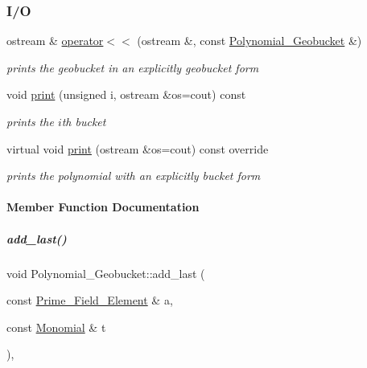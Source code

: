 \subsubsection*{I/O}
\begin{DoxyCompactItemize}
\item 
ostream \& \hyperlink{group__polygroup_af97062198c6ade3e8d3077308e89669d}{operator$<$$<$} (ostream \&, const \hyperlink{group__polygroup_class_polynomial___geobucket}{Polynomial\+\_\+\+Geobucket} \&)
\begin{DoxyCompactList}\small\item\em prints the geobucket in an explicitly geobucket form \end{DoxyCompactList}\item 
void \hyperlink{group__polygroup_a672dd35e16935aaa5d5334283eab918e}{print} (unsigned i, ostream \&os=cout) const
\begin{DoxyCompactList}\small\item\em prints the $i$th bucket \end{DoxyCompactList}\item 
virtual void \hyperlink{group__polygroup_a3c8cb0c53e9acf4d60345fb4b4dbb807}{print} (ostream \&os=cout) const override
\begin{DoxyCompactList}\small\item\em prints the polynomial with an explicitly bucket form \end{DoxyCompactList}\end{DoxyCompactItemize}


\paragraph{Member Function Documentation}
\mbox{\label{group__polygroup_ada4a539d3666cd6801a75c8861bc35fa}} 
\subparagraph{\texorpdfstring{add\+\_\+last()}{add\_last()}}
{\footnotesize\ttfamily void Polynomial\+\_\+\+Geobucket\+::add\+\_\+last (\begin{DoxyParamCaption}\item[{const \hyperlink{group___fields_group_class_prime___field___element}{Prime\+\_\+\+Field\+\_\+\+Element} \&}]{a,  }\item[{const \hyperlink{group__polygroup_class_monomial}{Monomial} \&}]{t }\end{DoxyParamCaption})\hspace{0.3cm}{\ttfamily [override]}, {\ttfamily [virtual]}}



